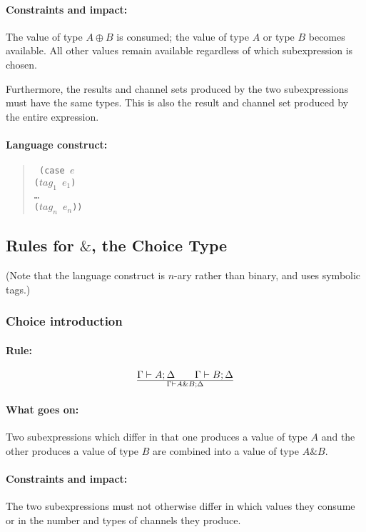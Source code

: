 \documentclass[a4paper]{article}
\begin{document}
\paragraph{Constraints and impact:} The value of type $A \oplus B$ is
consumed; the value of type $A$ or type $B$ becomes available.
All other values remain available regardless of which subexpression is chosen.

Furthermore, the results and channel sets produced by the two
subexpressions must have the same types.
This is also the result and channel set produced by the entire
expression.

\paragraph{Language construct:}
\begin{quote}\tt
  (case $e$\\
  \phantom{ }\quad ($\mathit{tag_1}$ $\mathit{e_1}$)\\
  \phantom{ }\quad \ldots\\
  \phantom{ }\quad ($\mathit{tag_n}$ $\mathit{e_n}$))
\end{quote}



\subsection{Rules for $\&$, the Choice Type}

(Note that the language construct is $n$-ary rather than binary, and
uses symbolic tags.)

\subsubsection{Choice introduction}

\paragraph{Rule:}
$$
{
  \Gamma \vdash A; \Delta
  \qquad
  \Gamma \vdash B; \Delta
}\over{
  \Gamma \vdash A\&B; \Delta
}
$$
\paragraph{What goes on:} Two subexpressions which differ in that one
produces a value of type $A$ and the other produces a value of type
$B$ are combined into a value of type $A\&B$.

\paragraph{Constraints and impact:} The two subexpressions must not
otherwise differ in which values they consume or in the number and
types of channels they produce.
\end{document}
